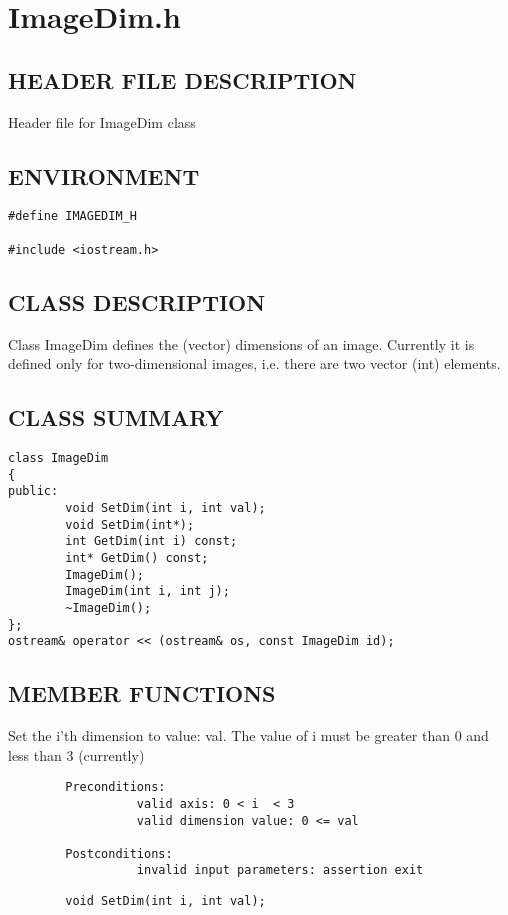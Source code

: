 \clearpage
\section{ImageDim.h}

\subsection*{HEADER FILE DESCRIPTION}
 Header file for ImageDim class
  
\subsection*{ENVIRONMENT}
\begin{verbatim}
#define IMAGEDIM_H

#include <iostream.h>
\end{verbatim}

\subsection*{CLASS DESCRIPTION}
    Class ImageDim defines the (vector) dimensions of an image. Currently
   it is defined only for two-dimensional images, i.e. there are two
   vector (int) elements.

\subsection*{CLASS SUMMARY}
\begin{verbatim}
class ImageDim
{
public:
        void SetDim(int i, int val);
        void SetDim(int*);
        int GetDim(int i) const;
        int* GetDim() const;
        ImageDim();
        ImageDim(int i, int j);
        ~ImageDim();
};
ostream& operator << (ostream& os, const ImageDim id);
\end{verbatim}

\subsection*{MEMBER FUNCTIONS}

           Set the i'th dimension to value: val. The value of i must
           be greater than 0 and less than 3 (currently)
\small\begin{verbatim}
        Preconditions:
                  valid axis: 0 < i  < 3
                  valid dimension value: 0 <= val
          
        Postconditions:
                  invalid input parameters: assertion exit
\end{verbatim}\normalsize          
\begin{verbatim}
        void SetDim(int i, int val);
\end{verbatim}

